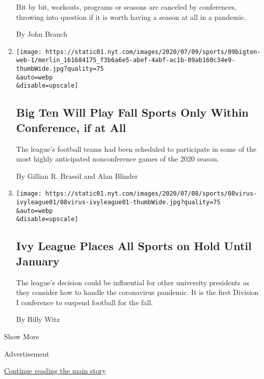 \begin{enumerate}
  Bit by bit, workouts, programs or seasons are canceled by conferences,
  throwing into question if it is worth having a season at all in a
  pandemic.

  By John Branch
\item
  \href{/2020/07/09/sports/ncaafootball/big-ten-fall-sports-in-conference.html}{}

  \texttt{[image: https://static01.nyt.com/images/2020/07/09/sports/09bigten-web-1/merlin\_161684175\_f3b6a6e5-abef-4abf-ac1b-89ab160c34e9-thumbWide.jpg?quality=75\\\&auto=webp\\\&disable=upscale]}

  \hypertarget{big-ten-will-play-fall-sports-only-within-conference-if-at-all}{%
  \subsection{Big Ten Will Play Fall Sports Only Within Conference, if
  at
  All}\label{big-ten-will-play-fall-sports-only-within-conference-if-at-all}}

  The league's football teams had been scheduled to participate in some
  of the most highly anticipated nonconference games of the 2020 season.

  By Gillian R. Brassil and Alan Blinder
\item
  \href{/2020/07/08/sports/ncaafootball/ivy-league-fall-sports-football-coronavirus.html}{}

  \texttt{[image: https://static01.nyt.com/images/2020/07/08/sports/08virus-ivyleague01/08virus-ivyleague01-thumbWide.jpg?quality=75\\\&auto=webp\\\&disable=upscale]}

  \hypertarget{ivy-league-places-all-sports-on-hold-until-january}{%
  \subsection{Ivy League Places All Sports on Hold Until
  January}\label{ivy-league-places-all-sports-on-hold-until-january}}

  The league's decision could be influential for other university
  presidents as they consider how to handle the coronavirus pandemic. It
  is the first Division I conference to suspend football for the fall.

  By Billy Witz
\end{enumerate}

Show More

Advertisement

\protect\hyperlink{after-mid1}{Continue reading the main story}

